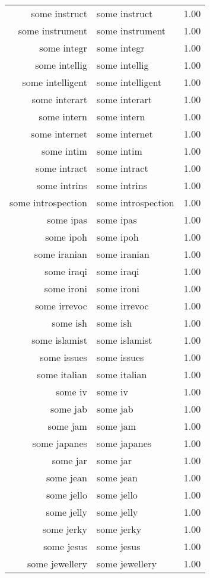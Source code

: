 \begin{table}[ht]
\begin{tabular}{rlr}
  some instruct & some instruct & 1.00 \\ 
  some instrument & some instrument & 1.00 \\ 
  some integr & some integr & 1.00 \\ 
  some intellig & some intellig & 1.00 \\ 
  some intelligent & some intelligent & 1.00 \\ 
  some interart & some interart & 1.00 \\ 
  some intern & some intern & 1.00 \\ 
  some internet & some internet & 1.00 \\ 
  some intim & some intim & 1.00 \\ 
  some intract & some intract & 1.00 \\ 
  some intrins & some intrins & 1.00 \\ 
  some introspection & some introspection & 1.00 \\ 
  some ipas & some ipas & 1.00 \\ 
  some ipoh & some ipoh & 1.00 \\ 
  some iranian & some iranian & 1.00 \\ 
  some iraqi & some iraqi & 1.00 \\ 
  some ironi & some ironi & 1.00 \\ 
  some irrevoc & some irrevoc & 1.00 \\ 
  some ish & some ish & 1.00 \\ 
  some islamist & some islamist & 1.00 \\ 
  some issues & some issues & 1.00 \\ 
  some italian & some italian & 1.00 \\ 
  some iv & some iv & 1.00 \\ 
  some jab & some jab & 1.00 \\ 
  some jam & some jam & 1.00 \\ 
  some japanes & some japanes & 1.00 \\ 
  some jar & some jar & 1.00 \\ 
  some jean & some jean & 1.00 \\ 
  some jello & some jello & 1.00 \\ 
  some jelly & some jelly & 1.00 \\ 
  some jerky & some jerky & 1.00 \\ 
  some jesus & some jesus & 1.00 \\ 
  some jewellery & some jewellery & 1.00 \\ 

\end{tabular}
\end{table}

